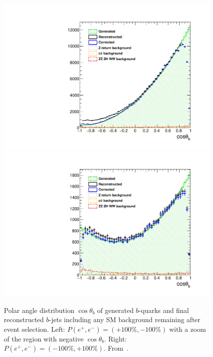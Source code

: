 \begin{figure}
       \includegraphics[width=0.45\linewidth]{./chapters/figures/basymmetry-final-left.pdf}
        \hspace{0.2cm}       
        \includegraphics[width=0.45\linewidth]{./chapters/figures/basymmetry-final-right.pdf}
	\caption{Polar angle distribution $\cos{\theta_b}$ of generated $b$-quarks and final reconstructed 
         $b$-jets including any SM  background remaining after event selection. 
         Left:  $P(e^+,e^-)=(+100\%,-100\%)$ with a zoom of the region with negative 
         $\cos{\theta_b}$.
         Right: $P(e^+,e^-)=(-100\%,+100\%)$. From~\cite{Bilokin:2017lco}.  }
	\label{fig:ffbar_basym}
\end{figure}


